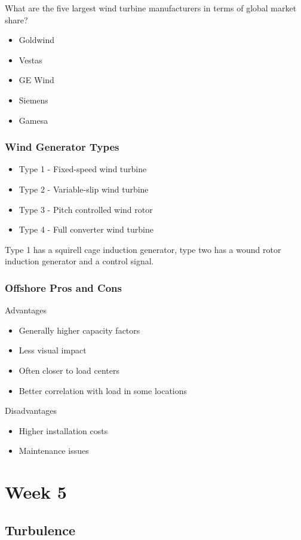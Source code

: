 \documentclass[12pt, a4paper]{report}
\begin{document}
  What are the five largest wind turbine manufacturers in terms of global market share?

  \begin{itemize}
    \item Goldwind
    \item Vestas
    \item GE Wind
    \item Siemens
    \item Gamesa
  \end{itemize}

  \section{Wind Generator Types}

  \begin{itemize}
    \item Type 1 - Fixed-speed wind turbine
    \item Type 2 - Variable-slip wind turbine
    \item Type 3 - Pitch controlled wind rotor
    \item Type 4 - Full converter wind turbine
  \end{itemize}

  Type 1 has a squirell cage induction generator, type two has a wound rotor induction generator and a control signal.

  \section{Offshore Pros and Cons}

  Advantages

  \begin{itemize}
    \item Generally higher capacity factors
    \item Less visual impact
    \item Often closer to load centers
    \item Better correlation with load in some locations
  \end{itemize}

  Disadvantages

  \begin{itemize}
    \item Higher installation costs
    \item Maintenance issues
  \end{itemize}







  \part{Week 5}

  \chapter{Turbulence}

  
\end{document}
